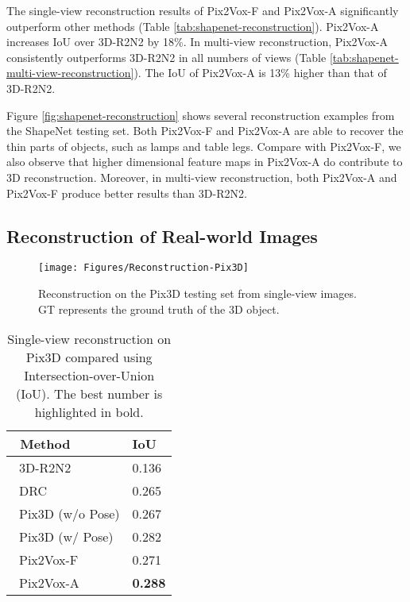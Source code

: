 \documentclass[10pt,twocolumn,letterpaper]{article}
\begin{document}
The single-view reconstruction results of Pix2Vox-F and Pix2Vox-A significantly outperform other methods (Table \ref{tab:shapenet-reconstruction}).
Pix2Vox-A increases IoU over 3D-R2N2 by 18\%. 
In multi-view reconstruction, Pix2Vox-A consistently outperforms 3D-R2N2 in all numbers of views (Table \ref{tab:shapenet-multi-view-reconstruction}). 
The IoU of Pix2Vox-A is 13\% higher than that of 3D-R2N2.

Figure \ref{fig:shapenet-reconstruction} shows several reconstruction examples from the ShapeNet testing set.
Both Pix2Vox-F and Pix2Vox-A are able to recover the thin parts of objects, such as lamps and table legs.
Compare with Pix2Vox-F, we also observe that higher dimensional feature maps in Pix2Vox-A do contribute to 3D reconstruction.
Moreover, in multi-view reconstruction, both Pix2Vox-A and Pix2Vox-F produce better results than 3D-R2N2.

\subsection{Reconstruction of Real-world Images}
\label{sec:pix3d-reconstruction}

\begin{figure}[!t]
  \centering
  \resizebox{\linewidth}{!} {
    \texttt{[image: Figures/Reconstruction-Pix3D]}
  }
  \caption{Reconstruction on the Pix3D testing set from single-view images. GT represents the ground truth of the 3D object.}
  \label{fig:pix3d-reconstruction}
  \vspace{-2 mm}
\end{figure}

\begin{table}
  \caption{Single-view reconstruction on Pix3D compared using Intersection-over-Union (IoU). The best number is highlighted in bold.}
  \vspace{-2 mm}
  \centering
  \begin{tabularx}{\linewidth}{XY}
    \toprule
    ~Method                                              & IoU \\
    \midrule
    ~3D-R2N2 \cite{DBLP:conf/eccv/ChoyXGCS16}            & 0.136 \\
    ~DRC \cite{DBLP:conf/cvpr/TulsianiZEM17}             & 0.265 \\
    ~Pix3D (w/o Pose) \cite{DBLP:conf/cvpr/Sun0ZZZXTF18} & 0.267 \\
    ~Pix3D (w/ Pose) \cite{DBLP:conf/cvpr/Sun0ZZZXTF18}  & 0.282 \\
    ~Pix2Vox-F                                           & 0.271 \\
    ~Pix2Vox-A                                           & \bf{0.288}\\
    \bottomrule
  \end{tabularx}
  \label{tab:pix3d-reconstruction}
  \vspace{-2 mm}
\end{table}
\end{document}
